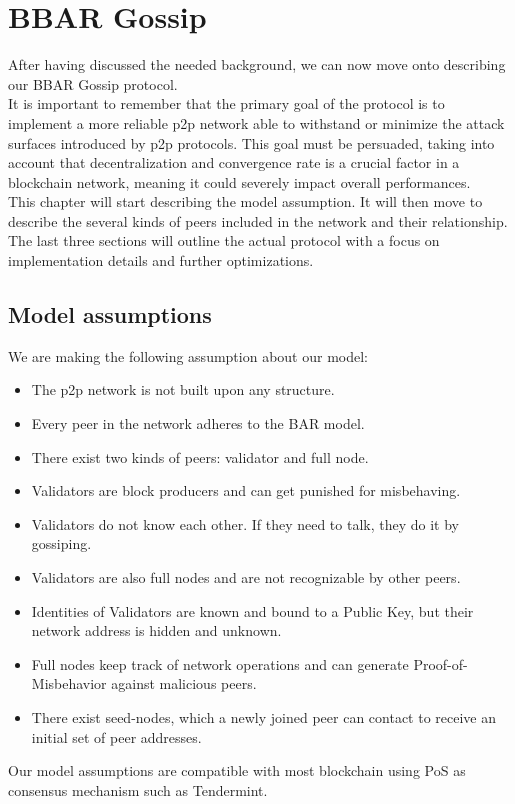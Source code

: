 \documentclass[mscthesis]{usiinfthesis}
\begin{document}
\chapter{BBAR Gossip}
After having discussed the needed background, we can now move onto describing our BBAR Gossip protocol.\\
 It is important to remember that the primary goal of the protocol is to implement a more reliable p2p network able to withstand or minimize the attack surfaces introduced by p2p protocols. This goal must be persuaded, taking into account that decentralization and convergence rate is a crucial factor in a blockchain network, meaning it could severely impact overall performances.\\
This chapter will start describing the model assumption. It will then move to describe the several kinds of peers included in the network and their relationship. The last three sections will outline the actual protocol with a focus on implementation details and further optimizations.

\section{Model assumptions}
We are making the following assumption about our model:
\begin{itemize}
	\item The p2p network is not built upon any structure.
	\item Every peer in the network adheres to the BAR model.
	\item There exist two kinds of peers: validator and full node.
	\item Validators are block producers and can get punished for misbehaving.
	\item Validators do not know each other. If they need to talk, they do it by gossiping.
	\item Validators are also full nodes and are not recognizable by other peers.
	\item Identities of Validators are known and bound to a Public Key, but their network address is hidden and unknown.
	\item Full nodes keep track of network operations and can generate Proof-of-Misbehavior against malicious peers.
	\item There exist seed-nodes, which a newly joined peer can contact to receive an initial set of peer addresses.
\end{itemize}
Our model assumptions are compatible with most blockchain using PoS as consensus mechanism such as Tendermint.
\end{document}
